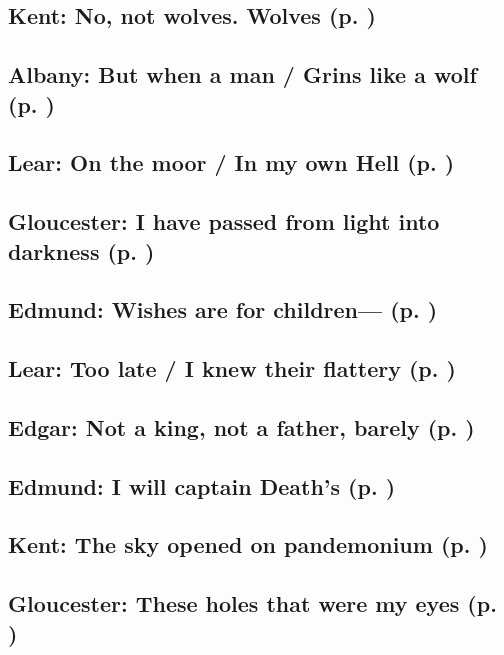 \subsection{Kent: No, not wolves. Wolves (p. \pageref{ch:lear_au})}

\subsection{Albany: But when a man / Grins like a wolf (p. \pageref{ch:lear_av})}

\subsection{Lear: On the moor / In my own Hell (p. \pageref{ch:lear_aw})}

\subsection{Gloucester: I have passed from light into darkness (p. \pageref{ch:lear_ax})}

\subsection{Edmund: Wishes are for children--- (p. \pageref{ch:lear_ay})}

\subsection{Lear: Too late / I knew their flattery (p. \pageref{ch:lear_az})}

\subsection{Edgar: Not a king, not a father, barely (p. \pageref{ch:lear_ba})}

\subsection{Edmund: I will captain Death's (p. \pageref{ch:lear_bb})}

\subsection{Kent: The sky opened on pandemonium (p. \pageref{ch:lear_bc})}

\subsection{Gloucester: These holes that were my eyes (p. \pageref{ch:lear_bd})}

